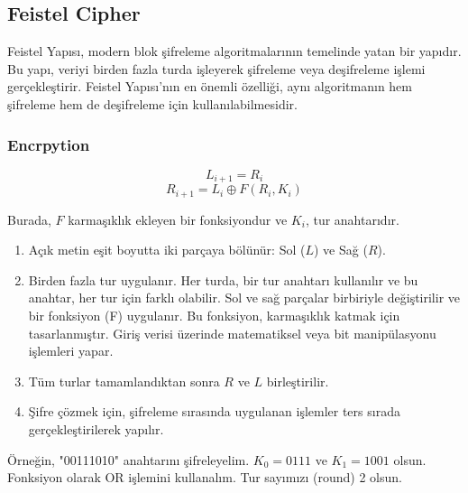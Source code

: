 \subsection{Feistel Cipher}

Feistel Yapısı, modern blok şifreleme algoritmalarının temelinde yatan bir yapıdır. Bu yapı, veriyi birden fazla turda işleyerek şifreleme veya deşifreleme işlemi gerçekleştirir. Feistel Yapısı'nın en önemli özelliği, aynı algoritmanın hem şifreleme hem de deşifreleme için kullanılabilmesidir. 

\subsubsection{Encrpytion}

\[ L_{i + 1} = R_i \]
\[ R_{i + 1} = L_i \oplus F(R_i, K_i) \]

Burada, $F$ karmaşıklık ekleyen bir fonksiyondur ve $K_i$, tur anahtarıdır.

\begin{enumerate}
    \item Açık metin eşit boyutta iki parçaya bölünür: Sol ($L$) ve Sağ ($R$).
    \item Birden fazla tur uygulanır. Her turda, bir tur anahtarı kullanılır ve bu anahtar, her tur için farklı olabilir. Sol ve sağ parçalar birbiriyle değiştirilir ve bir fonksiyon (F) uygulanır. Bu fonksiyon, karmaşıklık katmak için tasarlanmıştır. Giriş verisi üzerinde matematiksel veya bit manipülasyonu işlemleri yapar.
    \item Tüm turlar tamamlandıktan sonra $R$ ve $L$ birleştirilir.
    \item Şifre çözmek için, şifreleme sırasında uygulanan işlemler ters sırada gerçekleştirilerek yapılır.
\end{enumerate}

Örneğin, "00111010" anahtarını şifreleyelim. $K_0 = 0111$ ve $K_1 = 1001$ olsun. Fonksiyon olarak OR işlemini kullanalım. Tur sayımızı (round) 2 olsun.

